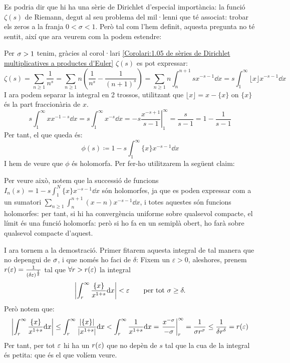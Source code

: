 Es podria dir que hi ha una sèrie de Dirichlet d'especial importància: la funció $\zeta(s)$ de Riemann, degut al seu problema del mil·lenni que té associat: trobar els zeros a la franja $0<\sigma<1$. Però tal com l'hem definit, aquesta pregunta no té sentit, així que ara veurem com la podem estendre:
\begin{pf}
    Per $\sigma>1$ tenim, gràcies al corol·lari \ref{Corolari:1.05 de sèries de Dirichlet multiplicatives a productes d'Euler} $\zeta(s)$ es pot expressar:
    \[
    \zeta(s)=\sum_{n\ge1}\frac{1}{n^s}=\sum_{n\geq1}n\left(\frac{1}{n^s}-\frac{1}{(n+1)^s}\right)=\sum_{n\geq1}n\int_{n}^{n+1}sx^{-s-1}\dd x=s\int_1^{\infty}\lfloor x\rfloor x^{-s-1}\dd x
    \]
    I ara podem separar la integral en 2 trossos, utilitzant que $\lfloor x \rfloor=x-\{x\}$ on $\{x\}$ és la part fraccionària de $x$.
    \[
    s\int_1^\infty xx^{-1-s}\dd x=s\int_1^\infty x^{-s}\dd x=\left.-s\frac{x^{-s+1}}{s-1}\right|_1^\infty=\frac{s}{s-1}=1-\frac{1}{s-1}
    \]
    Per tant, el que queda és:
    \[
    \phi(s)\coloneq1-s\int_1^\infty \{x\}x^{-s-1}\dd x
    \]
    I hem de veure que $\phi$ és holomorfa. Per fer-ho utilitzarem la següent claim:
    \begin{pf}Per veure això, notem que la successió de funcions $I_n(s)=1-s\int_1^N \{x\}x^{-s-1}\dd x$ són holomorfes, ja que es poden expressar com a un sumatori $\sum_{n\geq1}\int_n^{n+1}(x-n)x^{-s-1}\dd x$, i totes aquestes són funcions holomorfes: per tant, si hi ha convergència uniforme sobre qualsevol compacte, el límit és una funció holomorfa: però si ho fa en un semiplà obert, ho farà sobre qualsevol compacte d'aquest.
    \end{pf}
    I ara tornem a la demostració. Primer fitarem aquesta integral de tal manera que no depengui de $\sigma$, i que només ho faci de $\delta$: Fixem un $\varepsilon>0$, aleshores, prenem $r(\varepsilon)=\frac{1}{\left(\delta\varepsilon\right)^{\frac{1}{\delta}}}$ tal que $\forall r>r(\varepsilon)$ la integral 
    \[
    \left|\int_r^\infty\frac{\{x\}}{x^{1+s}}\mathrm{d} x\right|<\varepsilon\qquad \text{per tot }\sigma\geq\delta.
    \]
    Però notem que:
    \[
    \left|\int_r^\infty\frac{\{x\}}{x^{1+s}}\mathrm{d} x\right|\leq\int_r^\infty\frac{|\{x\}|}{\left|x^{1+s}\right|}\mathrm{d} x<\int_r^\infty\frac{1}{x^{1+s}}\mathrm{d} x=\left.\frac{x^{-\sigma}}{-\sigma}\right|_{r}^{\infty}=\frac{1}{\sigma r^{\sigma}}\leq\frac{1}{\delta r^\delta}=r(\varepsilon)
    \]
    Per tant, per tot $\varepsilon$ hi ha un $r(\varepsilon)$ que no depèn de $s$ tal que la cua de la integral és petita: que és el que volíem veure.
\end{pf}

